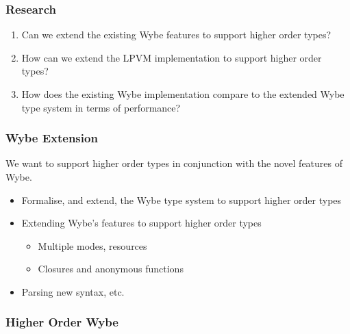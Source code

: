 \documentclass{beamer}
\begin{document}


\begin{frame}
  \frametitle{Research }

  \begin{enumerate}
    \item Can we \alert<2>{extend} the existing \alert<2>{Wybe features to support higher order types}?
    \item How can we \alert<2>{extend the LPVM implementation to support higher order types}?
    \item How does the existing Wybe implementation \alert<2>{compare} to \alert<2>{the extended Wybe type system in terms of performance}? 
  \end{enumerate}
\end{frame}

\begin{frame}
  \frametitle{Wybe Extension}

  We want to support higher order types in conjunction with the novel features of Wybe.

  \vspace{2em}

  \begin{itemize}
    \item Formalise, and extend, the Wybe type system to support higher order types
    \item Extending Wybe's features to support higher order types
    \begin{itemize}
      \item Multiple modes, resources
      \item Closures and anonymous functions
    \end{itemize}
    \item Parsing new syntax, etc.
  \end{itemize}
\end{frame}

\begin{frame}[fragile]
  \frametitle{Higher Order Wybe}

  \begin{example}
    \begin{semiverbatim}
\end{semiverbatim}
  \end{example}
\end{frame}
\end{document}
